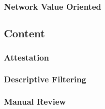 \subsubsection{Network Value Oriented}

\subsection{Content}

\subsubsection{Attestation}

\subsubsection{Descriptive Filtering}

\subsubsection{Manual Review}
